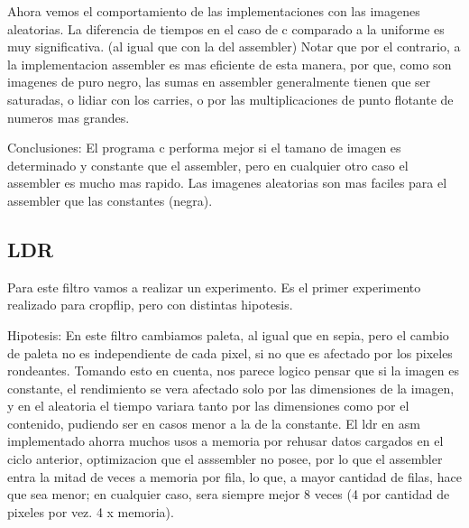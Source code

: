    
   
   
   \hfill \break

 Ahora vemos el comportamiento de las implementaciones con las imagenes aleatorias. La diferencia de tiempos en el caso de c comparado a la  uniforme es muy significativa. (al igual que con la del assembler) Notar 
que por el contrario, a la implementacion assembler es mas eficiente de esta manera,  por que, como son imagenes de puro negro, las sumas en assembler generalmente tienen que ser saturadas, o lidiar con los carries, o por las multiplicaciones de punto flotante de numeros mas grandes.





\hfill \break


Conclusiones: El programa c performa mejor si el tamano de imagen es determinado y constante que el assembler, pero en cualquier otro caso el assembler es mucho mas rapido. Las imagenes aleatorias son mas faciles para el assembler que las constantes (negra). 

\hfill \break







\subsection{LDR}
\hfill \break
Para este filtro vamos a realizar un experimento. Es el primer  experimento realizado para cropflip, pero con distintas hipotesis.

\hfill \break
Hipotesis: En este filtro cambiamos paleta, al igual que en sepia, pero el cambio de paleta no es independiente de cada pixel, si no que es afectado por los pixeles rondeantes. Tomando esto en cuenta, nos parece logico pensar que si la imagen es constante, el rendimiento se vera afectado solo por las dimensiones de la imagen, y en el aleatoria el tiempo variara tanto por las dimensiones como por el contenido, pudiendo ser en casos menor a la de la constante. El ldr en asm implementado ahorra muchos usos a memoria por rehusar datos cargados en el ciclo anterior, optimizacion que el asssembler no posee, por lo que el assembler entra la mitad de veces a memoria por fila, lo que, a mayor cantidad de filas, hace que sea menor; en cualquier caso, sera siempre mejor 8 veces (4 por cantidad de pixeles por vez. 4 x memoria).    


\hfill \break




